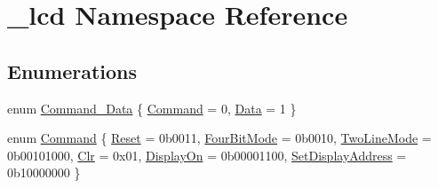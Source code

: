 \hypertarget{namespace__lcd}{}\section{\+\_\+lcd Namespace Reference}
\label{namespace__lcd}
\subsection*{Enumerations}
\begin{DoxyCompactItemize}
\item 
enum \hyperlink{namespace__lcd_a9f7614e7fea5ffaebb00ea80e12f3dd3}{Command\+\_\+\+Data} \{ \newline
\hyperlink{namespace__lcd_a9f7614e7fea5ffaebb00ea80e12f3dd3ad12d5ab1f7869bcedb4765e9ab842899}{Command} = 0, 
\newline
\hyperlink{namespace__lcd_a9f7614e7fea5ffaebb00ea80e12f3dd3a56b1d3a17b45a9d1398078bf65e59dc9}{Data} = 1
 \}
\item 
enum \hyperlink{namespace__lcd_a1e6379f737c7a8316c1f747bbe272a5c}{Command} \{ \newline
\hyperlink{namespace__lcd_a1e6379f737c7a8316c1f747bbe272a5ca3b3de96221abcb1c3d3ef1f78bb9264a}{Reset} = 0b0011, 
\newline
\hyperlink{namespace__lcd_a1e6379f737c7a8316c1f747bbe272a5ca110bfb8eb206eb5256d5e82e299df73d}{Four\+Bit\+Mode} = 0b0010, 
\newline
\hyperlink{namespace__lcd_a1e6379f737c7a8316c1f747bbe272a5ca93b3fc2b92ce6b332d401abfb699be7e}{Two\+Line\+Mode} = 0b00101000, 
\newline
\hyperlink{namespace__lcd_a1e6379f737c7a8316c1f747bbe272a5ca82ccf463d69663da5ccb3cbf20f3a7d6}{Clr} = 0x01, 
\newline
\hyperlink{namespace__lcd_a1e6379f737c7a8316c1f747bbe272a5ca2d47da9dda986ed8b8b236f4cd1de30b}{Display\+On} = 0b00001100, 
\newline
\hyperlink{namespace__lcd_a1e6379f737c7a8316c1f747bbe272a5cae30487a6b61d39b93aeb113c8682c892}{Set\+Display\+Address} = 0b10000000
 \}
\end{DoxyCompactItemize}
